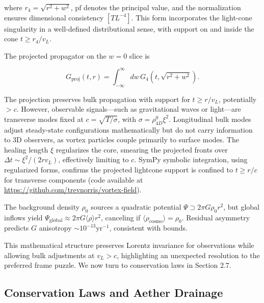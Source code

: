 where $r_4 = \sqrt{r^2 + w^2}$, $\text{pf}$ denotes the principal value, and the normalization ensures dimensional consistency $[T L^{-4}]$. This form incorporates the light-cone singularity in a well-defined distributional sense, with support on and inside the cone $t \geq r_4 / v_L$.

The projected propagator on the $w=0$ slice is

\begin{equation}
G_{\text{proj}}(t, r) = \int_{-\infty}^{\infty} dw \, G_4(t, \sqrt{r^2 + w^2}).
\end{equation}

The projection preserves bulk propagation with support for $t \geq r / v_L$, potentially $>c$. However, observable signals---such as gravitational waves or light---are transverse modes fixed at $c = \sqrt{T / \sigma}$, with $\sigma = \rho_{4D}^0 \xi^2$. Longitudinal bulk modes adjust steady-state configurations mathematically but do not carry information to 3D observers, as vortex particles couple primarily to surface modes. The healing length $\xi$ regularizes the core, smearing the projected fronts over $\Delta t \sim \xi^2 / (2 r v_L)$, effectively limiting to $c$. SymPy symbolic integration, using regularized forms, confirms the projected lightcone support is confined to $t \geq r / c$ for transverse components (code available at \url{https://github.com/trevnorris/vortex-field}).

The background density $\rho_0$ sources a quadratic potential $\Psi \supset 2\pi G \rho_0 r^2$, but global inflows yield $\Psi_{\text{global}} \approx 2\pi G \langle \rho \rangle r^2$, canceling if $\langle \rho_{\text{cosmo}} \rangle = \rho_0$. Residual asymmetry predicts $G$ anisotropy $\sim 10^{-13} \text{yr}^{-1}$, consistent with bounds.

\medskip
\noindent
{}
\medskip

This mathematical structure preserves Lorentz invariance for observations while allowing bulk adjustments at $v_L > c$, highlighting an unexpected resolution to the preferred frame puzzle. We now turn to conservation laws in Section 2.7.

\subsection{Conservation Laws and Aether Drainage}

